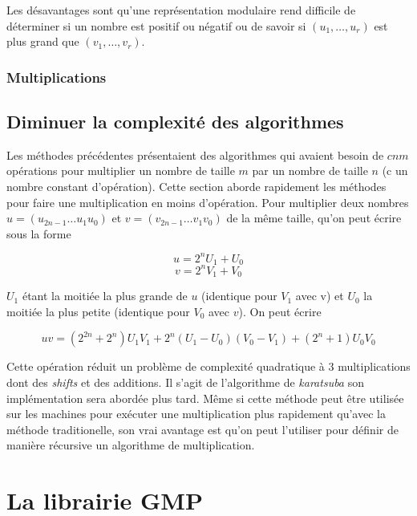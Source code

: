 \documentclass[letterpaper]{article}
\begin{document}
Les désavantages sont qu'une représentation modulaire rend difficile de
déterminer si un nombre est positif ou négatif ou de savoir si
$(u_1, \dots, u_r)$ est plus grand que $(v_1, \dots, v_r)$.

\subsubsection{Multiplications}

\subsection{Diminuer la complexité des algorithmes}

Les méthodes précédentes présentaient des algorithmes qui avaient besoin de
$cnm$ opérations pour multiplier un nombre de taille $m$ par un nombre de
taille $n$ (c un nombre constant d'opération). Cette section aborde rapidement
les méthodes pour faire une multiplication en moins d'opération.
\newline
Pour multiplier deux nombres $u = (u_{2n-1} \dots u_1 u_0)$ et
$v = (v_{2n-1} \dots v_1 v_0)$ de la même taille, qu'on peut écrire sous la
forme

  $$u = 2^{n} U_1 + U_0$$
  $$v = 2^{n} V_1 + V_0$$

$U_1$ étant la moitiée la plus grande de $u$ (identique pour $V_1$ avec v) et
$U_0$ la moitiée la plus petite (identique pour $V_0$ avec $v$). On peut écrire

  $$uv = (2^{2n} + 2^n) U_1 V_1 + 2^n (U_1 - U_0) (V_0 - V_1) + (2^n + 1) U_0 V_0$$

Cette opération réduit un problème de complexité quadratique à 3 multiplications
dont des \emph{shifts} et des additions. Il s'agit de l'algorithme de
\emph{karatsuba} son implémentation sera abordée plus tard.
\newline
Même si cette méthode peut être utilisée sur les machines pour exécuter une
multiplication plus rapidement qu'avec la méthode traditionelle, son vrai
avantage est qu'on peut l'utiliser pour définir de manière récursive un
algorithme de multiplication.


\section{La librairie GMP}
\end{document}
